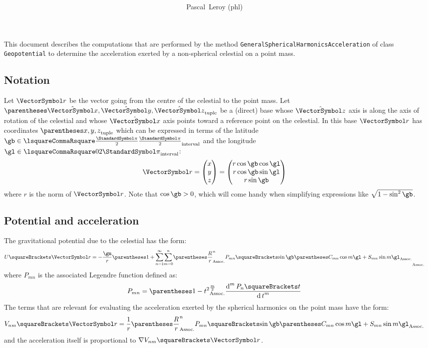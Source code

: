 \documentclass[10pt, a4paper, twoside]{basestyle}
\title{%
\textdisplay{%
Geopotential%
}%
}
\author{Pascal~Leroy (phl)}
\begin{document}
\maketitle
\begin{sloppypar}
\noindent
This document describes the computations that are performed by the method \texttt{GeneralSphericalHarmonicsAcceleration} of class \texttt{Geopotential} to determine the acceleration exerted by a non-spherical celestial on a point mass.
\end{sloppypar}

\subsection*{Notation}
Let $\vr$ be the vector going from the centre of the celestial to the point mass.  Let $\tuple{\hat{\vx}, \hat{\vy}, \hat{\vz}}$ be a (direct) base whose $\hat{\vz}$ axis is along the axis of rotation of the celestial and whose $\hat{\vx}$ axis points toward a reference point on the celestial.  In this base $\vr$ has coordinates $\tuple{x, y, z}$ which can be expressed in terms of the latitude $\gb \in \intclos{\frac{\Pi}{2}}{\frac{\Pi}{2}}$ and the longitude
$\gl \in \intclos{0}{2 \Pi}$:
\[
\vr=\begin{pmatrix}
x \\ y \\ z
\end{pmatrix}
=\begin{pmatrix}
r \cos \gb \cos \gl\\
r \cos \gb \sin \gl\\
r \sin \gb
\end{pmatrix}
\]
where $r$ is the norm of $\vr$.  Note that $\cos \gb > 0$, which will come handy when simplifying expressions like $\sqrt{1 - \sin^2 \gb}$.

\subsection*{Potential and acceleration}
The gravitational potential due to the celestial has the form:
\[
U\of\vr = -\frac{\gm}{r}\pa{1 + \sum{n = 1}[\infty] \sum{m = 0}[n] 
\pa{\frac{R}{r}}^n P_{m n}\of{\sin \gb}
\pa{C_{m n} \cos m \gl + S_{m n} \sin m \gl}
}
\]
where $P_{m n}$ is the associated Legendre function defined as:
\[
P_{m n} = \pa{1 - t^2}^{\frac{m}{2}} \deriv[m] t {P_n\of t}
\]
The terms that are relevant for evaluating the acceleration exerted by the spherical harmonics on the point mass have the form:
\[
V_{n m}\of\vr = \frac{1}{r}\pa{\frac{R}{r}}^n P_{m n}\of{\sin \gb}
\pa{C_{m n} \cos m \gl + S_{m n} \sin m \gl}
\]
and the acceleration itself is proportional to $\grad V_{n m}\of\vr$.
\end{document}
